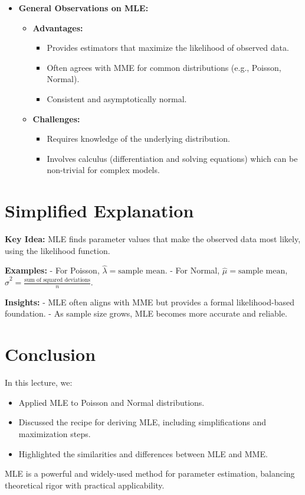 \documentclass{article}
\begin{document}
\begin{itemize}
  \item \textbf{General Observations on MLE:}
    \begin{itemize}
      \item \textbf{Advantages:}
        \begin{itemize}
          \item Provides estimators that maximize the likelihood of observed data.
          \item Often agrees with MME for common distributions (e.g., Poisson, Normal).
          \item Consistent and asymptotically normal.
        \end{itemize}
      \item \textbf{Challenges:}
        \begin{itemize}
          \item Requires knowledge of the underlying distribution.
          \item Involves calculus (differentiation and solving equations) which can be non-trivial for complex models.
        \end{itemize}
    \end{itemize}
\end{itemize}

\section*{Simplified Explanation}

\textbf{Key Idea:}
MLE finds parameter values that make the observed data most likely, using the likelihood function.

\textbf{Examples:}
- For Poisson, $\hat{\lambda} = \text{sample mean}$.
- For Normal, $\hat{\mu} = \text{sample mean}$, $\hat{\sigma}^2 = \frac{\text{sum of squared deviations}}{n}$.

\textbf{Insights:}
- MLE often aligns with MME but provides a formal likelihood-based foundation.
- As sample size grows, MLE becomes more accurate and reliable.

\section*{Conclusion}

In this lecture, we:
\begin{itemize}
  \item Applied MLE to Poisson and Normal distributions.
  \item Discussed the recipe for deriving MLE, including simplifications and maximization steps.
  \item Highlighted the similarities and differences between MLE and MME.
\end{itemize}

MLE is a powerful and widely-used method for parameter estimation, balancing theoretical rigor with practical applicability.
\end{document}
